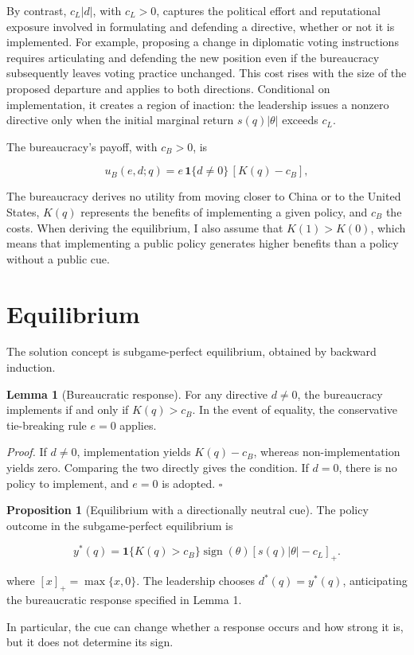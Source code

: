\documentclass[
  11pt,
]{article}
\theoremstyle{definition}
\newtheorem{proposition}{Proposition}
\newtheorem{lemma}{Lemma}
\begin{document}
By contrast, \(c_L|d|\), with \(c_L>0\), captures the political effort
and reputational exposure involved in formulating and defending a
directive, whether or not it is implemented. For example, proposing a
change in diplomatic voting instructions requires articulating and
defending the new position even if the bureaucracy subsequently leaves
voting practice unchanged. This cost rises with the size of the proposed
departure and applies to both directions. Conditional on implementation,
it creates a region of inaction: the leadership issues a nonzero
directive only when the initial marginal return \(s(q)|\theta|\) exceeds
\(c_L\).

The bureaucracy's payoff, with \(c_B>0\), is

\[
u_B(e,d;q)
=
e\,\mathbf{1}\{d\neq0\}\,[K(q)-c_B],
\tag{2}
\]

The bureaucracy derives no utility from moving closer to China or to the
United States, \(K(q)\) represents the benefits of implementing a given
policy, and \(c_B\) the costs. When deriving the equilibrium, I also
assume that \(K(1)>K(0)\), which means that implementing a public policy
generates higher benefits than a policy without a public cue.

\section{Equilibrium}\label{equilibrium}

The solution concept is subgame-perfect equilibrium, obtained by
backward induction.

\begin{lemma}[Bureaucratic response]
For any directive $d\neq0$, the bureaucracy implements if and only if $K(q)>c_B$. In the event of equality, the conservative tie-breaking rule $e=0$ applies.
\end{lemma}

\textit{Proof.} If \(d\neq0\), implementation yields \(K(q)-c_B\),
whereas non-implementation yields zero. Comparing the two directly gives
the condition. If \(d=0\), there is no policy to implement, and \(e=0\)
is adopted. \(\square\)

\begin{proposition}[Equilibrium with a directionally neutral cue]
The policy outcome in the subgame-perfect equilibrium is

\[
y^*(q)=
\mathbf{1}\{K(q)>c_B\}
\operatorname{sign}(\theta)
\left[s(q)|\theta|-c_L\right]_{+}.
\tag{3}
\]

where $\left[x\right]_{+}=\max\{x,0\}$. The leadership chooses $d^*(q)=y^*(q)$, anticipating the bureaucratic response specified in Lemma 1.

In particular, the cue can change whether a response occurs and how strong it is, but it does not determine its sign.
\end{proposition}
\end{document}
